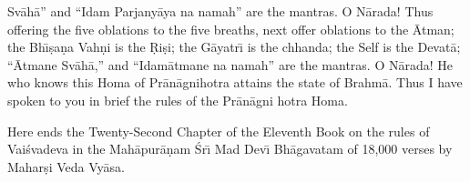 Sv\=ah\=a'' and ``Idam Parjany\=aya na namah'' are the mantras. O N\=arada! Thus offering the five oblations to the five breaths, next offer oblations to the \=Atman; the Bh\={\i}\d{s}a\d{n}a Vah\d{n}i is the \d{R}i\d{s}i; the G\=ayatr\={\i} is the chhanda; the Self is the Devat\=a; ``\=Atmane Sv\=ah\=a,'' and ``Idam\=atmane na namah'' are the mantras. O N\=arada! He who knows this Homa of Pr\=an\=agnihotra attains the state of Brahm\=a. Thus I have spoken to you in brief the rules of the Pr\=an\=agni hotra Homa.

Here ends the Twenty-Second Chapter of the Eleventh Book on the rules of Vai\'svadeva in the Mah\=apur\=a\d{n}am \'Sr\={\i} Mad Dev\={\i} Bh\=agavatam of 18,000 verses by Mahar\d{s}i Veda Vy\=asa.



